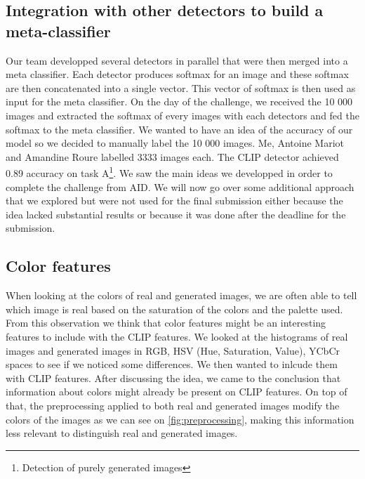 \documentclass[12pt,a4paper]{article}
\begin{document}
\subsection{Integration with other detectors to build a meta-classifier}
Our team developped several detectors in parallel that were then merged into a meta classifier. Each detector produces softmax for an image and these softmax are then concatenated into a single vector. This vector of softmax is then used as input for the meta classifier. On the day of the challenge, we received the 10 000 images and extracted the softmax of every images with each detectors and fed the softmax to the meta classifier. We wanted to have an idea of the accuracy of our model so we decided to manually label the 10 000 images. Me, Antoine Mariot and Amandine Roure labelled 3333 images each. The CLIP detector achieved 0.89 accuracy on task A\footnote{Detection of purely generated images}. We saw the main ideas we developped in order to complete the challenge from AID. We will now go over some additional approach that we explored but were not used for the final submission either because the idea lacked substantial results or because it was done after the deadline for the submission.

\subsection{Color features}
When looking at the colors of real and generated images, we are often able to tell which image is real based on the saturation of the colors and the palette used. From this observation we think that color features might be an interesting features to include with the CLIP features. We looked at the histograms of real images and generated images in RGB, HSV (Hue, Saturation, Value), YCbCr spaces to see if we noticed some differences. We then wanted to inlcude them with CLIP features. After discussing the idea, we came to the conclusion that information about colors might already be present on CLIP features. On top of that, the preprocessing applied to both real and generated images modify the colors  of the images as we can see on \autoref*{fig:preprocessing}, making this information less relevant to distinguish real and generated images.
\end{document}
